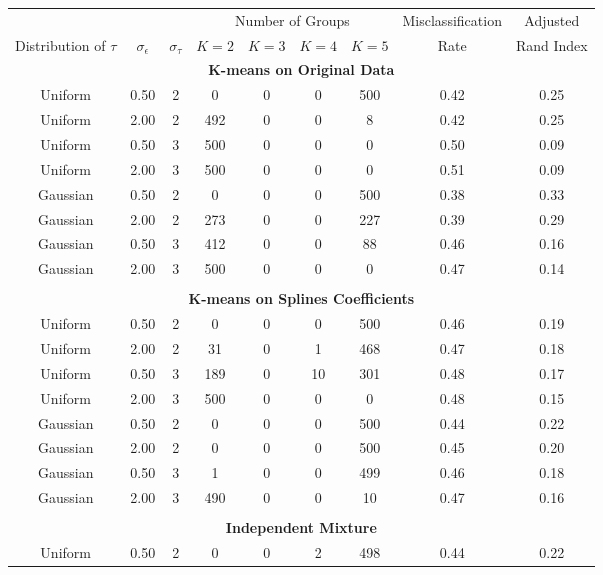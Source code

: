 \begin{table}[ht]
\begin{center}
\begin{tabular}{ccc|cccccc}
  \hline &&&\multicolumn{4}{c}{Number of Groups}&Misclassification&Adjusted\\ Distribution of $\tau$&$\sigma_{\epsilon}$&$\sigma_{\tau}$&$K=2$&$K=3$&$K=4$&$K=5$&Rate&Rand Index\\ \hline\multicolumn{9}{c}{\textbf{K-means on Original Data}}\\ Uniform & 0.50 &   2 &   0 &   0 &   0 & 500 & 0.42 & 0.25 \\ 
  Uniform & 2.00 &   2 & 492 &   0 &   0 &   8 & 0.42 & 0.25 \\ 
  Uniform & 0.50 &   3 & 500 &   0 &   0 &   0 & 0.50 & 0.09 \\ 
  Uniform & 2.00 &   3 & 500 &   0 &   0 &   0 & 0.51 & 0.09 \\ 
  Gaussian & 0.50 &   2 &   0 &   0 &   0 & 500 & 0.38 & 0.33 \\ 
  Gaussian & 2.00 &   2 & 273 &   0 &   0 & 227 & 0.39 & 0.29 \\ 
  Gaussian & 0.50 &   3 & 412 &   0 &   0 &  88 & 0.46 & 0.16 \\ 
  Gaussian & 2.00 &   3 & 500 &   0 &   0 &   0 & 0.47 & 0.14 \\ 
   \\ \multicolumn{9}{c}{\textbf{K-means on Splines Coefficients}}\\Uniform & 0.50 &   2 &   0 &   0 &   0 & 500 & 0.46 & 0.19 \\ 
  Uniform & 2.00 &   2 &  31 &   0 &   1 & 468 & 0.47 & 0.18 \\ 
  Uniform & 0.50 &   3 & 189 &   0 &  10 & 301 & 0.48 & 0.17 \\ 
  Uniform & 2.00 &   3 & 500 &   0 &   0 &   0 & 0.48 & 0.15 \\ 
  Gaussian & 0.50 &   2 &   0 &   0 &   0 & 500 & 0.44 & 0.22 \\ 
  Gaussian & 2.00 &   2 &   0 &   0 &   0 & 500 & 0.45 & 0.20 \\ 
  Gaussian & 0.50 &   3 &   1 &   0 &   0 & 499 & 0.46 & 0.18 \\ 
  Gaussian & 2.00 &   3 & 490 &   0 &   0 &  10 & 0.47 & 0.16 \\ 
   \\ \multicolumn{9}{c}{\textbf{Independent Mixture}}\\Uniform & 0.50 &   2 &   0 &   0 &   2 & 498 & 0.44 & 0.22 \\ 

\end{tabular}
\end{center}
\end{table}
